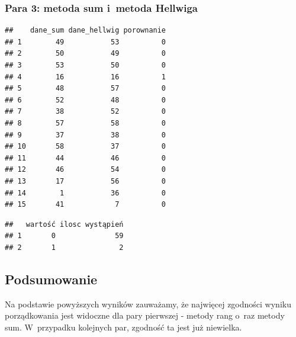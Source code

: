 \documentclass[12pt,a4paper]{report}
\begin{document}
{\subsubsection{Para 3: metoda sum i~metoda
Hellwiga}%
\begin{Shaded}
\begin{Highlighting}[]
\NormalTok{(}\NormalTok{,}\NormalTok{)}
\NormalTok{:}
\NormalTok{\{}
  \NormalTok{\{}
  \NormalTok{\}}
\NormalTok{\}}
\NormalTok{)}
\end{Highlighting}
\end{Shaded}
\begin{verbatim}
##    dane_sum dane_hellwig porownanie
## 1        49           53          0
## 2        50           49          0
## 3        53           50          0
## 4        16           16          1
## 5        48           57          0
## 6        52           48          0
## 7        38           52          0
## 8        57           58          0
## 9        37           38          0
## 10       58           37          0
## 11       44           46          0
## 12       46           54          0
## 13       17           56          0
## 14        1           36          0
## 15       41            7          0
\end{verbatim}
\begin{Shaded}
\begin{Highlighting}[]
\NormalTok{(}
\NormalTok{(}\NormalTok{,}\NormalTok{)}
\end{Highlighting}
\end{Shaded}
\begin{verbatim}
##   wartość ilosc wystąpień
## 1       0              59
## 2       1               2
\end{verbatim}
\subsection{Podsumowanie}\label{podsumowanie}
Na podstawie powyższych wyników zauważamy, że najwięcej zgodności wyniku
porządkowania jest widoczne dla pary pierwszej - metody rang o~raz metody
sum. W~przypadku kolejnych par, zgodność ta jest już niewielka.
}
\end{document}
